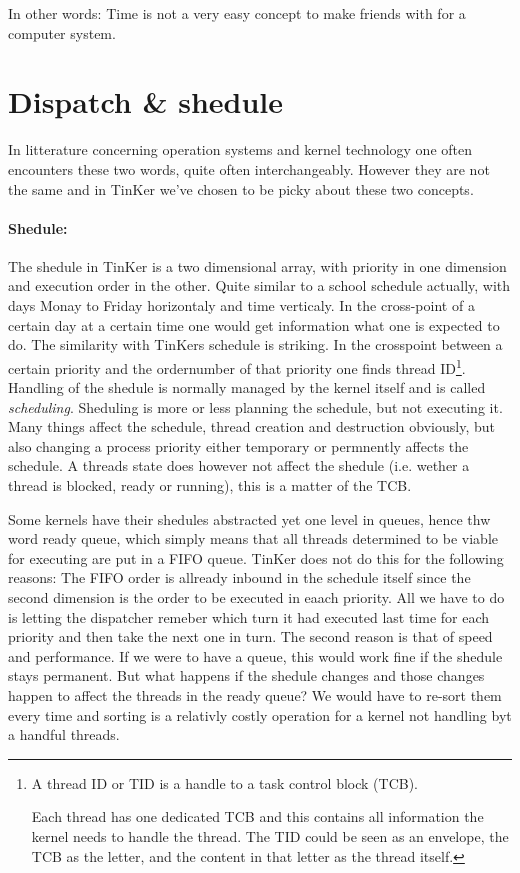 		In other words: Time is not a very easy concept to make friends with for a computer system.


		\section{Dispatch \& shedule}
		In litterature concerning operation systems and kernel technology one often encounters these two words, quite often interchangeably. However they are not the same and in TinKer we've chosen to be picky about these two concepts.

		\paragraph{Shedule:} The shedule in TinKer is a two dimensional array, with priority in one dimension and execution order in the other. Quite similar to a school schedule actually, with days Monay to Friday horizontaly and time verticaly. In the cross-point of a certain day at a certain time one would get information what one is expected to do. The similarity with TinKers schedule is striking. In the crosspoint between a certain priority and the ordernumber of that priority one finds thread ID\footnote{A thread ID or TID is a handle to a task control block (TCB). 

		Each thread has one dedicated TCB and this  contains all information the kernel needs to handle the thread. The TID could be seen as an envelope, the TCB as the letter, and the content in that letter as the thread itself.}. Handling of the shedule is normally managed by the kernel itself and is called \textit{scheduling}. Sheduling is more or less planning the schedule, but not executing it. Many things affect the schedule, thread creation and destruction obviously, but also changing a process priority either temporary or permnently affects the schedule. A threads state does however not affect the shedule (i.e. wether a thread is blocked, ready or running), this is a matter of the TCB. 

		Some kernels have their shedules abstracted yet one level in queues, hence thw word ready queue, which simply means that all threads determined to be viable for executing are put in a FIFO queue. TinKer does not do this for the following reasons: The FIFO order is allready inbound in the schedule itself since the second dimension is the order to be executed in eaach priority. All we have to do is letting the dispatcher remeber which turn it had executed last time for each priority and then take the next one in turn. The second reason is that of speed and performance. If we were to have a queue, this would work fine if the shedule stays permanent. But what happens if the shedule changes and those changes happen to affect the threads in the ready queue? We would have to re-sort them every time and sorting is a relativly costly operation for a kernel not handling byt a handful threads.

